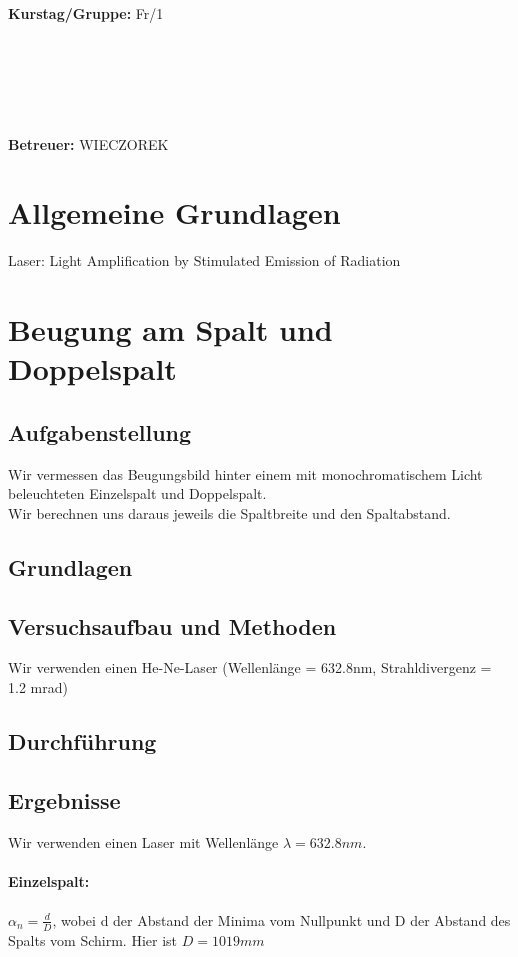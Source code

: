 \documentclass{article}
\begin{document}
\begin{verbatim}


\end{verbatim}
			\begin{flushleft}
			\textbf{\Large{Kurstag/Gruppe:}} \Large{Fr/1}
			\end{flushleft}

\begin{verbatim}






\end{verbatim}
			\begin{flushleft}
			\LARGE{\textbf{Betreuer:}}	\Large{WIECZOREK}	
			\end{flushleft}
\newpage	

\section{Allgemeine Grundlagen}
Laser: Light Amplification by Stimulated Emission of Radiation

\section{Beugung am Spalt und Doppelspalt}

\subsection{Aufgabenstellung}
Wir vermessen das Beugungsbild hinter einem mit monochromatischem Licht  beleuchteten Einzelspalt und Doppelspalt. \\
Wir berechnen uns daraus jeweils die Spaltbreite und den Spaltabstand.
\subsection{Grundlagen}
\subsection{Versuchsaufbau und Methoden}
Wir verwenden einen He-Ne-Laser (Wellenlänge = 632.8nm, Strahldivergenz = 1.2 mrad)
\subsection{Durchführung}
\subsection{Ergebnisse}
Wir verwenden einen Laser mit Wellenlänge $\lambda=632.8nm$.\\
\\
\textbf{Einzelspalt:}\\
\\
$\alpha_n=\frac{d}{D}$, wobei d der Abstand der Minima vom Nullpunkt und D der Abstand des Spalts vom Schirm. Hier ist $D=1019mm$\\
\end{document}
